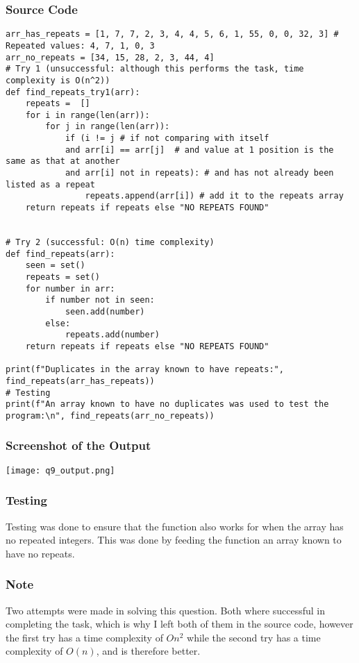 \documentclass{article}
\begin{document}
\subsubsection*{Source Code}
\begin{lstlisting}
arr_has_repeats = [1, 7, 7, 2, 3, 4, 4, 5, 6, 1, 55, 0, 0, 32, 3] # Repeated values: 4, 7, 1, 0, 3
arr_no_repeats = [34, 15, 28, 2, 3, 44, 4]
# Try 1 (unsuccessful: although this performs the task, time complexity is O(n^2))
def find_repeats_try1(arr):
    repeats =  []
    for i in range(len(arr)):
        for j in range(len(arr)):
            if (i != j # if not comparing with itself
            and arr[i] == arr[j]  # and value at 1 position is the same as that at another
            and arr[i] not in repeats): # and has not already been listed as a repeat
                repeats.append(arr[i]) # add it to the repeats array
    return repeats if repeats else "NO REPEATS FOUND"


# Try 2 (successful: O(n) time complexity)
def find_repeats(arr):
    seen = set()
    repeats = set()
    for number in arr:
        if number not in seen:
            seen.add(number)
        else:
            repeats.add(number)
    return repeats if repeats else "NO REPEATS FOUND"

print(f"Duplicates in the array known to have repeats:", find_repeats(arr_has_repeats))
# Testing
print(f"An array known to have no duplicates was used to test the program:\n", find_repeats(arr_no_repeats))

\end{lstlisting}

\subsubsection*{Screenshot of the Output}
\texttt{[image: q9\_output.png]}

\subsubsection*{Testing}
Testing was done to ensure that the function also works for when the array has no repeated integers. This was done by feeding the function an array known to have no repeats.

\subsubsection*{Note}
Two attempts were made in solving this question. Both where successful in completing the task, which is why I left both of them in the source code, however the first try has a time complexity of $On^2$ while the second try has a time complexity of $O(n)$, and is therefore better. 
\end{document}
